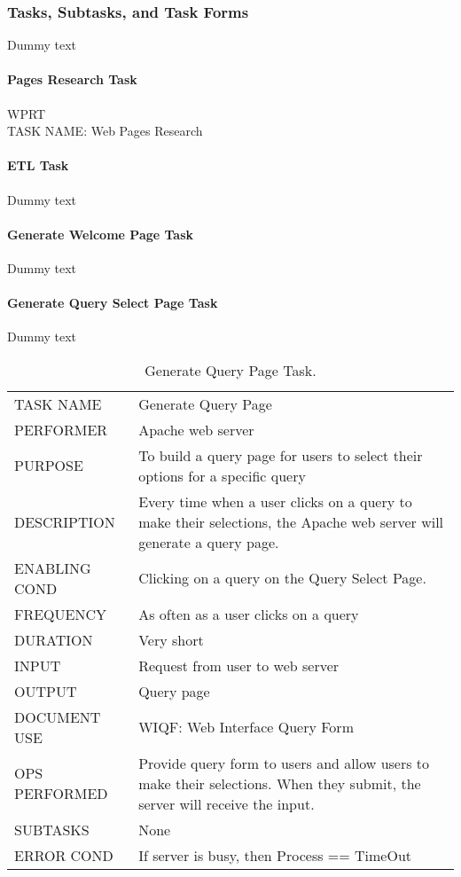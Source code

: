 \documentclass{article}
\begin{document}
\subsubsection{Tasks, Subtasks, and Task Forms}
Dummy text
\noindent\paragraph{Pages Research Task\\}
       WPRT\\
TASK NAME:             Web Pages Research


\paragraph{ETL Task\\}
Dummy text
\paragraph{Generate Welcome Page Task\\}
Dummy text
\paragraph{Generate Query Select Page Task\\}
Dummy text


\begin{table}[h!]
  \centering
  \caption{Generate Query Page Task.}
  \label{tab:table5}
  \begin{tabular}{lp{10cm}}
       \hline
     TASK NAME & Generate Query Page\\
     PERFORMER & Apache web server\\
     PURPOSE & To build a query page for users to select their options for a specific query\\
     DESCRIPTION & Every time when a user clicks on a query to make their selections, the Apache web server will generate a query page.\\
     ENABLING COND & Clicking on a query on the Query Select Page.\\
     FREQUENCY & As often as a user clicks on a query\\
     DURATION & Very short\\
     INPUT & Request from user to web server\\
     OUTPUT & Query page\\
     DOCUMENT USE & WIQF: Web Interface Query Form\\
     OPS PERFORMED & Provide query form to users and  allow users to make their selections. When they submit, the server will receive the input.\\
     SUBTASKS & None\\
     ERROR COND &  If server is busy, then Process == TimeOut\\
       \hline
  \end{tabular}
\end{table}
\end{document}
